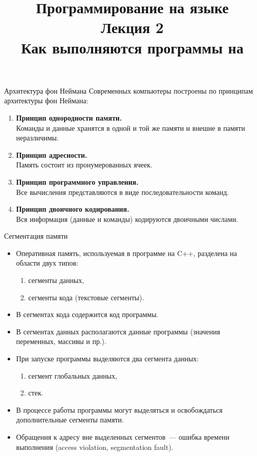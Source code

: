 \documentclass{beamer}
\title{{\bf Программирование на языке \langcpp\protect\\Лекция
2\protect\vspace{1em}\\}Как выполняются программы на \langcpp}
\begin{document}
\begin{frame} 
  \titlepage
\end{frame}

\begin{frame}[fragile]{Архитектура фон Неймана}
Современных компьютеры построены по принципам 
архитектуры фон Неймана:
\begin{enumerate}
    \item {\bf Принцип однородности памяти.}\\
        Команды и данные хранятся в одной и той же памяти и внешне в памяти неразличимы.
    \item {\bf Принцип адресности.}\\
        Память состоит из пронумерованных ячеек.
    \item {\bf Принцип программного управления.}\\
        Все вычисления представляются в виде последовательности команд.
    \item {\bf Принцип двоичного кодирования.}\\
        Вся информация (данные и команды) кодируются двоичными числами.
\end{enumerate}
\end{frame}

\begin{frame}[fragile]{Сегментация памяти}
    \begin{itemize}
        \item Оперативная память, используемая в программе на C++,
            разделена на области двух типов:
            \begin{enumerate}
                \item сегменты данных,
                \item сегменты кода (текстовые сегменты).
            \end{enumerate}

        \item В сегментах кода содержится код программы.

        \item В сегментах данных располагаются данные программы 
            (значения переменных, массивы и пр.).

        \item При запуске программы выделяются два сегмента данных:
            \begin{enumerate}
                \item сегмент глобальных данных,
                \item стек.
            \end{enumerate}

        \item В процессе работы программы могут выделяться и освобождаться
            дополнительные сегменты памяти.

        \item Обращения к адресу вне выделенных сегментов~--- ошибка времени
            выполнения (access violation, segmentation fault).
    \end{itemize}
\end{frame}
\end{document}
